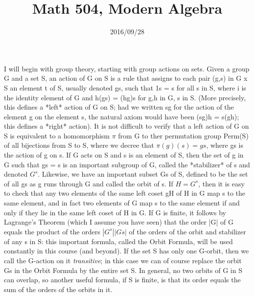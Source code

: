 \documentclass[10pt]{article}
\title{Math 504, Modern Algebra}
\date{2016/09/28}
\begin{document}
\maketitle

I will begin with group theory, starting with group actions on sets.
Given a group G and a set S, an action of G on S is a rule that assigns
to each pair (g,s) in G x S an element t of S, usually denoted gs, such
that 1s = s for all s in S, where i is the identity element of G and
h(gs) = (hg)s for g,h in G, s in S. (More precisely, this defines a
*left* action of G on S; had we written sg for the action of the element
g on the element s, the natural axiom would have been (sg)h = s(gh);
this defines a *right* action). It is not difficult to verify that a
left action of G on S is equivalent to a homomorphism $\pi$ from G to
ther permutation group Perm(S) of all bijections from S to S, where we
decree that $\pi(g)(s) = gs$, where gs is the action of g on s. If G
acts on S and s is an element of S, then the set of g in G such that gs
= s is an important subgroup of G, called the *stabilizer* of s and
denoted $G^s$. Likewise, we have an important subset Gs of S, defined to
be the set of all gs as g runs through G and called the orbit of s. If
$H = G^s$, then it is easy to check that any two elements of the same
left coset gH of H in G map s to the same element, and in fact two
elements of G map s to the same element if and only if they lie in the
same left coset of H in G. If G is finite, it follows by Lagrange's
Theorem (which I assume you have seen) that the order |G| of G equals
the product of the orders $|G^s||Gs|$ of the orders of the orbit and
stabilizer of any s in S: this important formula, called the Orbit
Formula, will be used constantly in this course (and beyond). If the set
S has only one G-orbit, then we call the G-action on it {\sl
  transitive}; in this case we can of course replace the orbit Gs in the
Orbit Formula by the entire set S. In general, no two orbits of G in S
can overlap, so another useful formula, if S is finite, is that its
order equals the sum of the orders of the orbits in it.
\end{document}
